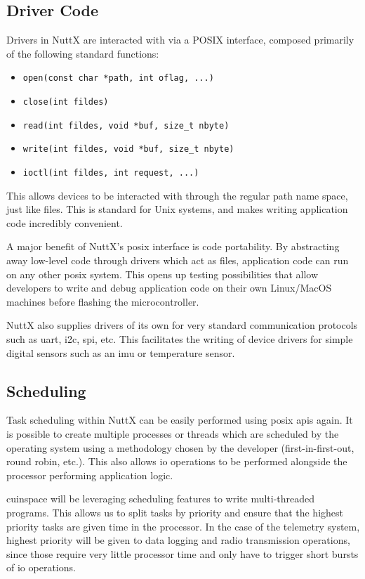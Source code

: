 \subsection{Driver Code}

Drivers in NuttX are interacted with via a POSIX interface, composed primarily of the following standard functions:

\begin{itemize}
    \item \texttt{open(const char *path, int oflag, ...)}
    \item \texttt{close(int fildes)}
    \item \texttt{read(int fildes, void *buf, size\_t nbyte)}
    \item \texttt{write(int fildes, void *buf, size\_t nbyte)}
    \item \texttt{ioctl(int fildes, int request, ...)}
\end{itemize}

This allows devices to be interacted with through the regular path name space, just like files. This is standard for
Unix systems, and makes writing application code incredibly convenient.

A major benefit of NuttX's \gls{posix} interface is code portability. By abstracting away low-level code through
drivers which act as files, application code can run on any other \gls{posix} system. This opens up testing
possibilities that allow developers to write and debug application code on their own Linux/MacOS machines before
flashing the microcontroller.

NuttX also supplies drivers of its own for very standard communication protocols such as \gls{uart}, \gls{i2c},
\gls{spi}, etc. This facilitates the writing of device drivers for simple digital sensors such as an \gls{imu} or
temperature sensor.

\subsection{Scheduling}

Task scheduling within NuttX can be easily performed using \gls{posix} \glspl{api} again. It is possible to create
multiple processes or threads which are scheduled by the operating system using a methodology chosen by the developer
(first-in-first-out, round robin, etc.). This also allows \gls{io} operations to be performed alongside the processor
performing application logic.

\Gls{cuinspace} will be leveraging scheduling features to write multi-threaded programs. This allows us to split tasks
by priority and ensure that the highest priority tasks are given time in the processor. In the case of the telemetry
system, highest priority will be given to data logging and radio transmission operations, since those require very
little processor time and only have to trigger short bursts of \gls{io} operations.

